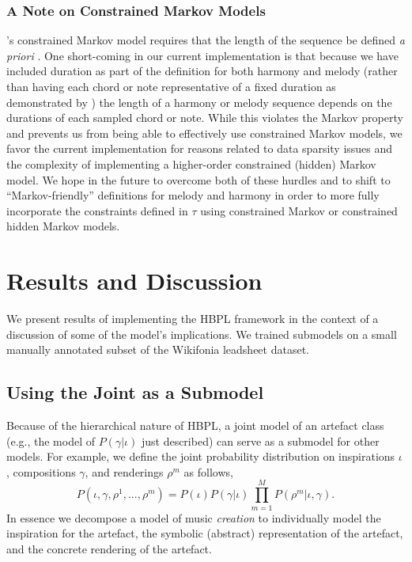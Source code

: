 \documentclass[phd,electronic,oneside,twosidetoc,letterpaper,chaptercenter,parttop,lof,lot]{byumsphd}
\begin{document}
\subsubsection{A Note on Constrained Markov Models}

\citeauthor{pachet2011finite}'s constrained Markov model requires that the length of the sequence be defined \emph{a priori} \cite{pachet2011finite}. One short-coming in our current implementation is that because we have included duration as part of the definition for both harmony and melody (rather than having each chord or note representative of a fixed duration as demonstrated by \citeauthor{pachet2014imitative} \cite{pachet2014imitative}) the length of a harmony or melody sequence depends on the durations of each sampled chord or note. While this violates the Markov property and prevents us from being able to effectively use constrained Markov models, we favor the current implementation for reasons related to data sparsity issues and the complexity of implementing a higher-order constrained (hidden) Markov model. We hope in the future to overcome both of these hurdles and to shift to ``Markov-friendly'' definitions for melody and harmony in order to more fully incorporate the constraints defined in $\tau$ using constrained Markov or constrained hidden Markov models.

\section{Results and Discussion}

We present results of implementing the HBPL framework in the context of a discussion of some of the model's implications. We trained submodels on a small manually annotated subset of the Wikifonia leadsheet dataset.

\subsection{Using the Joint as a Submodel}

Because of the hierarchical nature of HBPL, a joint model of an artefact class (e.g., the model of $P(\gamma|\iota)$ just described) can serve as a submodel for other models. For example, we define the joint probability distribution on inspirations $\iota$, compositions $\gamma$, and renderings $\rho^{m}$ as follows,
\[ P(\iota,\gamma,\rho^1, ..., \rho^m) = P(\iota)P(\gamma|\iota) \prod_{m=1}^M P(\rho^m|\iota,\gamma). \]
In essence we decompose a model of music \emph{creation} to individually model the inspiration for the artefact, the symbolic (abstract) representation of the artefact, and the concrete rendering of the artefact. 
\end{document}
